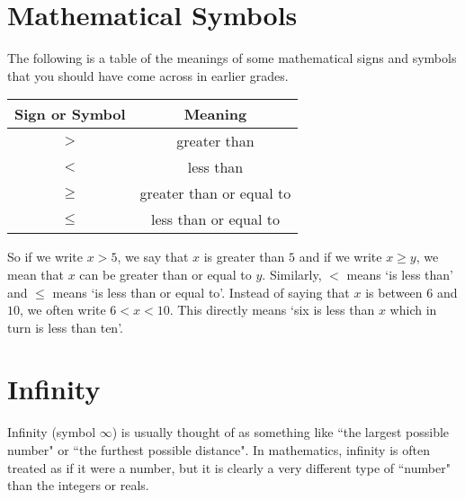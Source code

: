 \documentclass[10pt,a4paper,titlepage,twoside,openright]{report}
\begin{document}
\section{Mathematical Symbols}

The following is a table of the meanings of some mathematical signs and symbols that you should have come across in earlier grades.

\begin{table}[htb]
\begin{center}
\begin{tabular}{|c|c|}\hline
Sign or Symbol & Meaning\\\hline\hline
$>$&greater than\\\hline
$<$&less than\\\hline
$\ge$& greater than or equal to\\\hline
$\le$& less than or equal to\\\hline
\end{tabular}
\end{center}
\end{table}

So if we write $x > 5$, we say that $x$ is greater than $5$ and if we write $x \geq y$, we mean that $x$ can be greater than or equal to $y$. Similarly, $<$ means `is less than' and $\leq$ means `is less than or equal to'. Instead of saying that $x$ is between $6$ and $10$, we often write $6<x<10$. This directly means `six is less than $x$ which in turn is less than ten'.



\section{Infinity}
Infinity (symbol $\infty$) is usually thought of as something like ``the largest possible number" or ``the furthest possible distance". In mathematics, infinity is often treated as if it were a number, but it is clearly a very different type of ``number" than the integers or reals.
\end{document}
